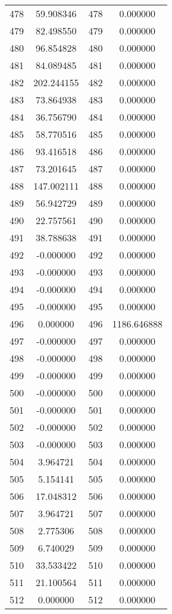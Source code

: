 \documentclass[12pt]{article}
\begin{document}
\begin{longtable}{@{}cccc@{}}
478 & 59.908346 & 478 & 0.000000 \\
479 & 82.498550 & 479 & 0.000000 \\
480 & 96.854828 & 480 & 0.000000 \\
481 & 84.089485 & 481 & 0.000000 \\
482 & 202.244155 & 482 & 0.000000 \\
483 & 73.864938 & 483 & 0.000000 \\
484 & 36.756790 & 484 & 0.000000 \\
485 & 58.770516 & 485 & 0.000000 \\
486 & 93.416518 & 486 & 0.000000 \\
487 & 73.201645 & 487 & 0.000000 \\
488 & 147.002111 & 488 & 0.000000 \\
489 & 56.942729 & 489 & 0.000000 \\
490 & 22.757561 & 490 & 0.000000 \\
491 & 38.788638 & 491 & 0.000000 \\
492 & -0.000000 & 492 & 0.000000 \\
493 & -0.000000 & 493 & 0.000000 \\
494 & -0.000000 & 494 & 0.000000 \\
495 & -0.000000 & 495 & 0.000000 \\
496 & 0.000000 & 496 & 1186.646888 \\
497 & -0.000000 & 497 & 0.000000 \\
498 & -0.000000 & 498 & 0.000000 \\
499 & -0.000000 & 499 & 0.000000 \\
500 & -0.000000 & 500 & 0.000000 \\
501 & -0.000000 & 501 & 0.000000 \\
502 & -0.000000 & 502 & 0.000000 \\
503 & -0.000000 & 503 & 0.000000 \\
504 & 3.964721 & 504 & 0.000000 \\
505 & 5.154141 & 505 & 0.000000 \\
506 & 17.048312 & 506 & 0.000000 \\
507 & 3.964721 & 507 & 0.000000 \\
508 & 2.775306 & 508 & 0.000000 \\
509 & 6.740029 & 509 & 0.000000 \\
510 & 33.533422 & 510 & 0.000000 \\
511 & 21.100564 & 511 & 0.000000 \\
512 & 0.000000 & 512 & 0.000000 \\

\end{longtable}
\end{document}
